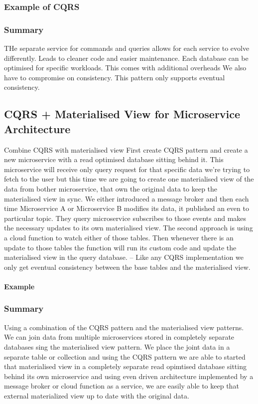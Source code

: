 \documentclass[a4paper, 11pt]{book}
\begin{document}
    \subsubsection{Example of CQRS}

    \subsubsection{Summary}
    THe separate service for commands and queries allows for each service to evolve differently.
    Leads to cleaner code and easier maintenance.
    Each database can be optimised for specific workloads.
    This comes with additional overheads
    We also have to compromise on consistency.
    This pattern only supports eventual consistency.

    \subsection{CQRS + Materialised View for Microservice Architecture}
    Combine CQRS with materialised view
    First create CQRS pattern and create a new microservice with a read optimised database sitting behind it.
    This microservice will receive only query request for that specific data we're trying to fetch to the user but this time we are going to create one materialised view of the data from bother microservice, that own the original data to keep the materialised view in sync.
    We either introduced a message broker and then each time Microservice A or Microservice B modifies its data, it published an even to particular topic.
    They query microservice subscribes to those events and makes the necessary updates to its own materialised view.
    The second approach is using a cloud function to watch either of those tables.
    Then whenever there is an update to those tables the function will run its custom code and update the materialised view in the query database.
    -- Like any CQRS implementation we only get eventual consistency between the base tables and the materialised view.

    \paragraph{Example}

    \subsubsection{Summary}
    Using a combination of the CQRS pattern and the materialised view patterns.
    We can join data from multiple microservices stored in completely separate databases sing the materialised view pattern.
    We place the joint data in a separate table or collection and using the CQRS pattern we are able to started that materialised view in a completely separate read opimtised database sitting behind its own microservice and using even driven architecture implemented by a message broker or cloud function as a service, we are easily able to keep that external materialized view up to date with the original data.
\end{document}
